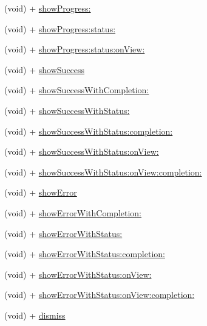\begin{DoxyCompactItemize}
\item 
(void) + \mbox{\hyperlink{interface_k_v_n_progress_abc53102e1cb121a8b38c3337ce372517}{show\+Progress\+:}}
\item 
(void) + \mbox{\hyperlink{interface_k_v_n_progress_a2c58c4d42f018ef3efbb163f6390004e}{show\+Progress\+:status\+:}}
\item 
(void) + \mbox{\hyperlink{interface_k_v_n_progress_a57a53b4b0ddb93f604d24c50ec9c0602}{show\+Progress\+:status\+:on\+View\+:}}
\item 
(void) + \mbox{\hyperlink{interface_k_v_n_progress_a3b92c0b7eeebe3537ba37d7f56c5b2bb}{show\+Success}}
\item 
(void) + \mbox{\hyperlink{interface_k_v_n_progress_aa5757d5457364be1b1a03224c934ff32}{show\+Success\+With\+Completion\+:}}
\item 
(void) + \mbox{\hyperlink{interface_k_v_n_progress_ae9b8b57302f6a4456658e758784790bf}{show\+Success\+With\+Status\+:}}
\item 
(void) + \mbox{\hyperlink{interface_k_v_n_progress_aa4d2366ad5664f42a3c9214f97e4d373}{show\+Success\+With\+Status\+:completion\+:}}
\item 
(void) + \mbox{\hyperlink{interface_k_v_n_progress_a86fcdede3818f360abfae851a7b1b7fc}{show\+Success\+With\+Status\+:on\+View\+:}}
\item 
(void) + \mbox{\hyperlink{interface_k_v_n_progress_a622aa6249f5eafaa2b61058bfe2f2d61}{show\+Success\+With\+Status\+:on\+View\+:completion\+:}}
\item 
(void) + \mbox{\hyperlink{interface_k_v_n_progress_aca67ff95ae9a6d0ad5237fdc1d5dd34c}{show\+Error}}
\item 
(void) + \mbox{\hyperlink{interface_k_v_n_progress_a9de6833483cb5bd061d150e8fb42e5f8}{show\+Error\+With\+Completion\+:}}
\item 
(void) + \mbox{\hyperlink{interface_k_v_n_progress_a3125f228cdd6685e4cf74fa960bfa234}{show\+Error\+With\+Status\+:}}
\item 
(void) + \mbox{\hyperlink{interface_k_v_n_progress_a518bc804665bbc2a01905a6b4caf9459}{show\+Error\+With\+Status\+:completion\+:}}
\item 
(void) + \mbox{\hyperlink{interface_k_v_n_progress_a639e363838fbea785adea0aa9b39ca39}{show\+Error\+With\+Status\+:on\+View\+:}}
\item 
(void) + \mbox{\hyperlink{interface_k_v_n_progress_a6cc598f816de8d78d34ab7a9d2216512}{show\+Error\+With\+Status\+:on\+View\+:completion\+:}}
\item 
(void) + \mbox{\hyperlink{interface_k_v_n_progress_a4b11cd2b647d08b5c05cf79b99e3f588}{dismiss}}

\end{DoxyCompactItemize}
